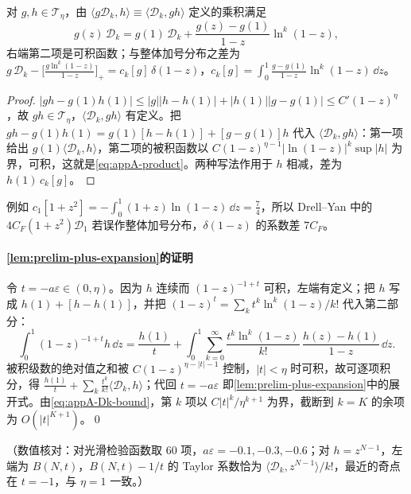 \begin{lemma}[乘积约定下的恒等式]\label{lem:appA-plus-product}
对 $g,h\in\mathcal T_\eta$，由 $\langle g\mathcal D_k,h\rangle\equiv\langle\mathcal D_k,gh\rangle$ 定义的乘积满足
\begin{equation}\label{eq:appA-product}
g(z)\,\mathcal D_k=g(1)\,\mathcal D_k+\frac{g(z)-g(1)}{1-z}\ln^k(1-z),
\end{equation}
右端第二项是可积函数；与整体加号分布之差为 $g\,\mathcal D_k-\big[\frac{g\ln^k(1-z)}{1-z}\big]_+=c_k[g]\,\delta(1-z)$，$c_k[g]=\int_0^1\frac{g-g(1)}{1-z}\ln^k(1-z)\,\dd z$。
\end{lemma}

\begin{proof}
$|gh-g(1)h(1)|\le|g||h-h(1)|+|h(1)||g-g(1)|\le C'(1-z)^\eta$，故 $gh\in\mathcal T_\eta$，$\langle\mathcal D_k,gh\rangle$ 有定义。把 $gh-g(1)h(1)=g(1)[h-h(1)]+[g-g(1)]h$ 代入 $\langle\mathcal D_k,gh\rangle$：第一项给出 $g(1)\langle\mathcal D_k,h\rangle$，第二项的被积函数以 $C(1-z)^{\eta-1}|\ln(1-z)|^k\sup|h|$ 为界，可积，这就是\cref{eq:appA-product}。两种写法作用于 $h$ 相减，差为 $h(1)\,c_k[g]$。
\end{proof}

例如 $c_1[1+z^2]=-\int_0^1(1+z)\ln(1-z)\,\dd z=\frac74$，所以 Drell--Yan 中的 $4C_F(1+z^2)\mathcal D_1$ 若误作整体加号分布，$\delta(1-z)$ 的系数差 $7C_F$。%

\paragraph{\cref{lem:prelim-plus-expansion}的证明}
令 $t=-a\varepsilon\in(0,\eta)$。因为 $h$ 连续而 $(1-z)^{-1+t}$ 可积，左端有定义；把 $h$ 写成 $h(1)+[h-h(1)]$，并把 $(1-z)^t=\sum_kt^k\ln^k(1-z)/k!$ 代入第二部分：
\[
\int_0^1(1-z)^{-1+t}h\,\dd z=\frac{h(1)}t+\int_0^1\sum_{k=0}^\infty\frac{t^k\ln^k(1-z)}{k!}\,\frac{h(z)-h(1)}{1-z}\,\dd z .
\]
被积级数的绝对值之和被 $C(1-z)^{\eta-|t|-1}$ 控制，$|t|<\eta$ 时可积，故可逐项积分，得 $\frac{h(1)}t+\sum_k\frac{t^k}{k!}\langle\mathcal D_k,h\rangle$；代回 $t=-a\varepsilon$ 即\cref{lem:prelim-plus-expansion}中的展开式。由\cref{eq:appA-Dk-bound}，第 $k$ 项以 $C|t|^k/\eta^{k+1}$ 为界，截断到 $k=K$ 的余项为 $O(|t|^{K+1})$。\qed

（数值核对：对光滑检验函数取 $60$ 项，$a\varepsilon=-0.1,-0.3,-0.6$；对 $h=z^{N-1}$，左端为 $B(N,t)$，$B(N,t)-1/t$ 的 Taylor 系数恰为 $\langle\mathcal D_k,z^{N-1}\rangle/k!$，最近的奇点在 $t=-1$，与 $\eta=1$ 一致。）

